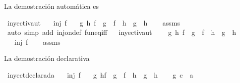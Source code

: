 \begin{isabellebody}
\begin{isamarkuptext}
  La demostración automática es%
\end{isamarkuptext}\isamarkuptrue%
\isamarkupfalse%
\ inyectivaut{\isacharcolon}\isanewline
\ \ \ {\isachardoublequoteopen}inj\ f{\isachardoublequoteclose}\isanewline
\ \ \ {\isachardoublequoteopen}{\isasymforall}g\ h{\isachardot}\ {\isacharparenleft}f\ {\isasymcirc}\ g\ {\isacharequal}\ f\ {\isasymcirc}\ h{\isacharparenright}\ {\isasymlongrightarrow}\ {\isacharparenleft}g\ {\isacharequal}\ h{\isacharparenright}{\isachardoublequoteclose}\isanewline
%
\isadelimproof
\ \ %
\endisadelimproof
%
\isatagproof
{}\isamarkupfalse%
\ assms\isanewline
\ \ \isamarkupfalse%
\ {\isacharparenleft}auto\ simp\ add{\isacharcolon}\ inj{\isacharunderscore}on{\isacharunderscore}def\ fun{\isacharunderscore}eq{\isacharunderscore}iff{\isacharparenright}%
\endisatagproof
{\isafoldproof}%
%
\isadelimproof
\ \isanewline
%
\endisadelimproof
\isanewline
{}\isamarkupfalse%
\ inyectivaut{}{\isacharcolon}\ \isanewline
\ \ \ {\isachardoublequoteopen}{\isasymforall}g\ h{\isachardot}\ {\isacharparenleft}{\isacharparenleft}f\ {\isasymcirc}\ g\ {\isacharequal}\ f\ {\isasymcirc}\ h{\isacharparenright}\ {\isasymlongrightarrow}\ {\isacharparenleft}g\ {\isacharequal}\ h{\isacharparenright}{\isacharparenright}{\isachardoublequoteclose}\isanewline
\ \ \ {\isachardoublequoteopen}inj\ f{\isachardoublequoteclose}\isanewline
%
\isadelimproof
\ \ %
\endisadelimproof
%
\isatagproof
{}\isamarkupfalse%
\ assms\isanewline
\ \ \isamarkupfalse%
%
\endisatagproof
{\isafoldproof}%
%
\isadelimproof
%
\endisadelimproof
%
\begin{isamarkuptext}%
La demostración declarativa%
\end{isamarkuptext}\isamarkuptrue%
\isamarkupfalse%
\ inyectdeclarada{\isacharcolon}\isanewline
\ \ \ {\isachardoublequoteopen}inj\ f{\isachardoublequoteclose}\isanewline
\ \ \ {\isachardoublequoteopen}{\isasymforall}g\ h{\isachardot}{\isacharparenleft}f\ {\isasymcirc}\ g\ {\isacharequal}\ f\ {\isasymcirc}\ h{\isacharparenright}\ {\isasymlongrightarrow}\ {\isacharparenleft}g\ {\isacharequal}\ h{\isacharparenright}{\isachardoublequoteclose}\isanewline
%
\isadelimproof
%
\endisadelimproof
%
\isatagproof
{}\isamarkupfalse%
\isanewline
\ \ \isamarkupfalse%
\ g{\isacharcolon}{\isacharcolon}\ {\isachardoublequoteopen}{\isacharprime}c\ {\isasymRightarrow}\ {\isacharprime}a{\isachardoublequoteclose}\isanewline

\end{isabellebody}
